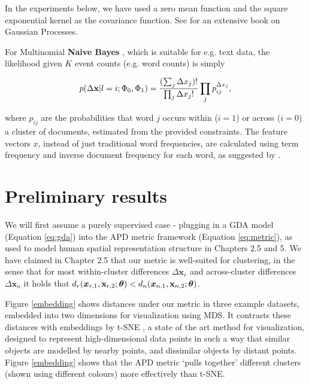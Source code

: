 \documentclass[12pt,PhD,twoside]{muthesis}
\begin{document}
In the experiments below, we have used a zero mean function and the square exponential kernel as the covariance function. See \citep{rasmussen2005gp} for an extensive book on Gaussian Processes.

For Multinomial \textbf{Naive Bayes} \citep{kibriya2005multinomial}, which is suitable for e.g. text data, the likelihood given $K$ event counts (e.g. word counts) is simply

\begin{equation}
\label{eq:nb}
p(\Delta \textbf x | l=i; \Phi_{0}, \Phi_{1}) = \frac{(\sum_j \Delta x_j)!}{\prod_j \Delta x_j!} \prod_j p_{ij}^{\Delta x_j},
\end{equation}

where $p_{ij}$ are the probabilities that word $j$ occurs within ($i=1$) or across ($i=0$) a cluster of documents, estimated from the provided constraints. The feature vectors $x$, instead of just traditional word frequencies, are calculated using term frequency and inverse document frequency for each word, as suggested by \citep{rennie2003tackling}.

\section*{Preliminary results}

We will first assume a purely supervised case - plugging in a GDA model (Equation \eqref{eq:gda}) into the APD metric framework (Equation \eqref{eq:metric}), as used to model human spatial representation structure in Chapters 2.5 and 5. We have claimed in Chapter 2.5 that our metric is well-suited for clustering, in the sense that for most within-cluster differences $\Delta \boldsymbol x_r$ and across-cluster differences $\Delta \boldsymbol x_n $ it holds that $ d_r(\boldsymbol x_{r,1}, \textbf x_{r,2}; \boldsymbol{\theta}) < d_n(\boldsymbol x_{n,1}, \textbf x_{n,2}; \boldsymbol{\theta}) $. 

Figure \ref{embedding} shows distances under our metric in three example datasets, embedded into two dimensions for visualization using MDS. It contrasts these distances with embeddings by t-SNE \citep{van2008visualizing}, a state of the art method for visualization, designed to represent high-dimensional data points in such a way that similar objects are modelled by nearby points, and dissimilar objects by distant points. Figure \ref{embedding} shows that the APD metric `pulls together' different clusters (shown using different colours) more effectively than t-SNE. 
\end{document}
